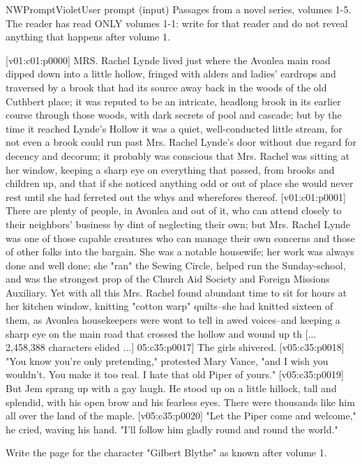 \begin{nwprompt}{NWPromptViolet}{User prompt (input)}
Passages from a novel series, volumes 1-5. The reader has read ONLY volumes 1-1: write for that reader and do not reveal anything that happens after volume 1.

[v01:c01:p0000] MRS. Rachel Lynde lived just where the Avonlea main road dipped down into a little hollow, fringed with alders and ladies' eardrops and traversed by a brook that had its source away back in the woods of the old Cuthbert place; it was reputed to be an intricate, headlong brook in its earlier course through those woods, with dark secrets of pool and cascade; but by the time it reached Lynde's Hollow it was a quiet, well-conducted little stream, for not even a brook could run past Mrs. Rachel Lynde's door without due regard for decency and decorum; it probably was conscious that Mrs. Rachel was sitting at her window, keeping a sharp eye on everything that passed, from brooks and children up, and that if she noticed anything odd or out of place she would never rest until she had ferreted out the whys and wherefores thereof.
[v01:c01:p0001] There are plenty of people, in Avonlea and out of it, who can attend closely to their neighbors' business by dint of neglecting their own; but Mrs. Rachel Lynde was one of those capable creatures who can manage their own concerns and those of other folks into the bargain. She was a notable housewife; her work was always done and well done; she "ran" the Sewing Circle, helped run the Sunday-school, and was the strongest prop of the Church Aid Society and Foreign Missions Auxiliary. Yet with all this Mrs. Rachel found abundant time to sit for hours at her kitchen window, knitting "cotton warp" quilts--she had knitted sixteen of them, as Avonlea housekeepers were wont to tell in awed voices--and keeping a sharp eye on the main road that crossed the hollow and wound up th
[... 2,458,388 characters elided ...]
05:c35:p0017] The girls shivered.
[v05:c35:p0018] "You know you're only pretending," protested Mary Vance, "and I wish you wouldn't. You make it too real. I hate that old Piper of yours."
[v05:c35:p0019] But Jem sprang up with a gay laugh. He stood up on a little hillock, tall and splendid, with his open brow and his fearless eyes. There were thousands like him all over the land of the maple.
[v05:c35:p0020] "Let the Piper come and welcome," he cried, waving his hand. "I'll follow him gladly round and round the world."

Write the page for the character "Gilbert Blythe" as known after volume 1.
\end{nwprompt}

